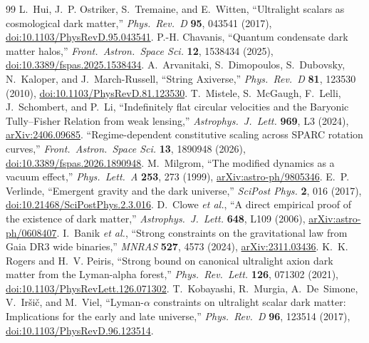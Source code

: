 \documentclass[11pt,letterpaper]{article}
\begin{document}
\begin{thebibliography}{99}
 L.~Hui, J.~P. Ostriker, S.~Tremaine, and E.~Witten, ``Ultralight scalars as cosmological dark matter,'' \emph{Phys.\ Rev.\ D} \textbf{95}, 043541 (2017), \href{https://link.aps.org/doi/10.1103/PhysRevD.95.043541}{doi:10.1103/PhysRevD.95.043541}.
 P.-H. Chavanis, ``Quantum condensate dark matter halos,'' \emph{Front.\ Astron.\ Space Sci.} \textbf{12}, 1538434 (2025), \href{https://www.frontiersin.org/journals/astronomy-and-space-sciences/articles/10.3389/fspas.2025.1538434/full}{doi:10.3389/fspas.2025.1538434}.
 A.~Arvanitaki, S.~Dimopoulos, S.~Dubovsky, N.~Kaloper, and J.~March-Russell, ``String Axiverse,'' \emph{Phys.\ Rev.\ D} \textbf{81}, 123530 (2010), \href{https://link.aps.org/doi/10.1103/PhysRevD.81.123530}{doi:10.1103/PhysRevD.81.123530}.
 T.~Mistele, S.~McGaugh, F.~Lelli, J.~Schombert, and P.~Li, ``Indefinitely flat circular velocities and the Baryonic Tully--Fisher Relation from weak lensing,'' \emph{Astrophys.\ J.\ Lett.} \textbf{969}, L3 (2024), \href{https://arxiv.org/abs/2406.09685}{arXiv:2406.09685}.
 ``Regime-dependent constitutive scaling across SPARC rotation curves,'' \emph{Front.\ Astron.\ Space Sci.} \textbf{13}, 1890948 (2026), \href{https://www.frontiersin.org/journals/astronomy-and-space-sciences/articles/10.3389/fspas.2026.1890948/full}{doi:10.3389/fspas.2026.1890948}.
 M.~Milgrom, ``The modified dynamics as a vacuum effect,'' \emph{Phys.\ Lett.\ A} \textbf{253}, 273 (1999), \href{https://arxiv.org/abs/astro-ph/9805346}{arXiv:astro-ph/9805346}.
 E.~P. Verlinde, ``Emergent gravity and the dark universe,'' \emph{SciPost Phys.} \textbf{2}, 016 (2017), \href{https://scipost.org/SciPostPhys.2.3.016}{doi:10.21468/SciPostPhys.2.3.016}.
 D.~Clowe \emph{et al.}, ``A direct empirical proof of the existence of dark matter,'' \emph{Astrophys.\ J.\ Lett.} \textbf{648}, L109 (2006), \href{https://arxiv.org/abs/astro-ph/0608407}{arXiv:astro-ph/0608407}.
 I.~Banik \emph{et al.}, ``Strong constraints on the gravitational law from Gaia DR3 wide binaries,'' \emph{MNRAS} \textbf{527}, 4573 (2024), \href{https://arxiv.org/abs/2311.03436}{arXiv:2311.03436}.
 K.~K. Rogers and H.~V. Peiris, ``Strong bound on canonical ultralight axion dark matter from the Lyman-alpha forest,'' \emph{Phys.\ Rev.\ Lett.} \textbf{126}, 071302 (2021), \href{https://link.aps.org/doi/10.1103/PhysRevLett.126.071302}{doi:10.1103/PhysRevLett.126.071302}.
 T.~Kobayashi, R.~Murgia, A.~De~Simone, V.~Ir\v{s}i\v{c}, and M.~Viel, ``Lyman-$\alpha$ constraints on ultralight scalar dark matter: Implications for the early and late universe,'' \emph{Phys.\ Rev.\ D} \textbf{96}, 123514 (2017), \href{https://link.aps.org/pdf/10.1103/PhysRevD.96.123514}{doi:10.1103/PhysRevD.96.123514}.

\end{thebibliography}
\end{document}
